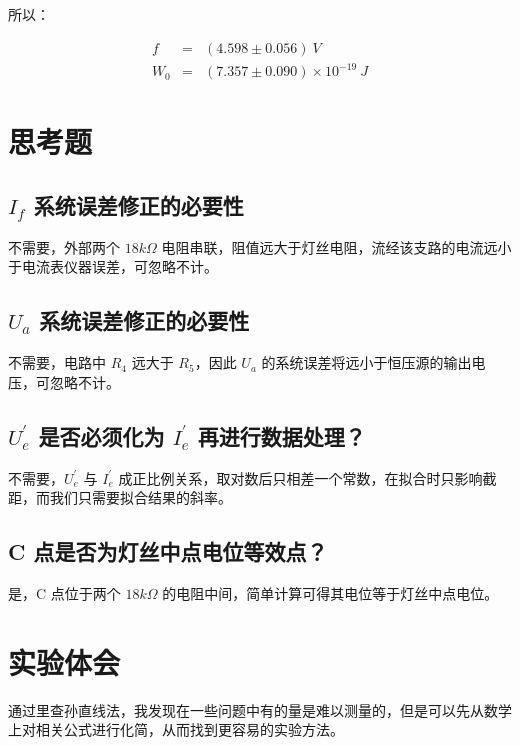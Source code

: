 \documentclass[a4paper]{article}
\begin{document}
\par 所以：

$$
\begin{array}{rcl}
	f&=&(4.598\pm 0.056)\ V\\
	W_0&=&(7.357\pm 0.090)\times 10^{-19}\ J
\end{array}
$$

\section{思考题}

\subsection{$I_f$ 系统误差修正的必要性}

\par 不需要，外部两个 $18k\Omega$ 电阻串联，阻值远大于灯丝电阻，流经该支路的电流远小于电流表仪器误差，可忽略不计。

\subsection{$U_a$ 系统误差修正的必要性}

\par 不需要，电路中 $R_4$ 远大于 $R_5$，因此 $U_a$ 的系统误差将远小于恒压源的输出电压，可忽略不计。

\subsection{$U_e^\prime$ 是否必须化为 $I_e^\prime$ 再进行数据处理？}

\par 不需要，$U_e^\prime$ 与 $I_e^\prime$ 成正比例关系，取对数后只相差一个常数，在拟合时只影响截距，而我们只需要拟合结果的斜率。

\subsection{C 点是否为灯丝中点电位等效点？}

\par 是，C 点位于两个 $18k\Omega$ 的电阻中间，简单计算可得其电位等于灯丝中点电位。

\section{实验体会}

\par 通过里查孙直线法，我发现在一些问题中有的量是难以测量的，但是可以先从数学上对相关公式进行化简，从而找到更容易的实验方法。
\end{document}
